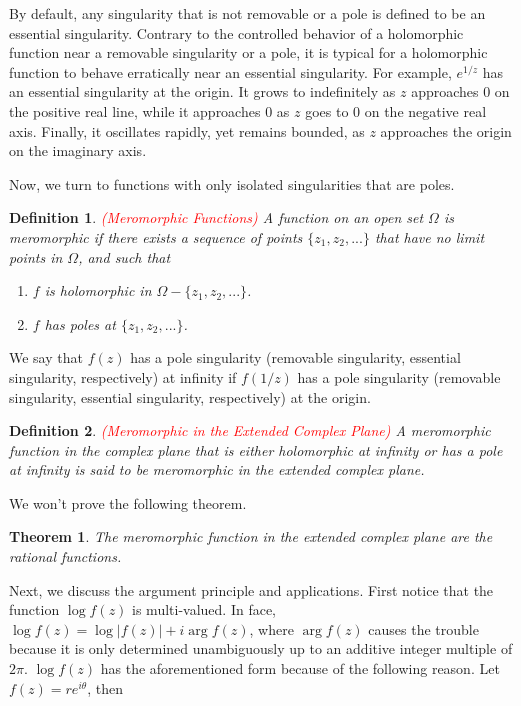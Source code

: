 \documentclass{article}
\newtheorem{definition}{Definition}
\newtheorem{theorem}{Theorem}
\begin{document}
By default, any singularity that is not removable or a pole is defined to be an essential singularity. Contrary to the controlled behavior of a holomorphic function near a removable singularity or a pole, it is typical for a holomorphic function to behave erratically near an essential singularity. For example, $e^{1/z}$ has an essential singularity at the origin. It grows to indefinitely as $z$ approaches $0$ on the positive real line, while it approaches $0$ as $z$ goes to $0$ on the negative real axis. Finally, it oscillates rapidly, yet remains bounded, as $z$ approaches the origin on the imaginary axis. 

Now, we turn to functions with only isolated singularities that are poles.

\begin{definition} \textcolor{red}{(Meromorphic Functions)}
A function on an open set $\Omega$ is meromorphic if there exists a sequence of points $\{z_1,z_2,...\}$ that have no limit points in $\Omega$, and such that 

\begin{enumerate}
\item
$f$ is holomorphic in $\Omega-\{z_1,z_2,...\}$.

\item
$f$ has poles at $\{z_1,z_2,...\}$.
\end{enumerate}
\end{definition}

We say that $f(z)$ has a pole singularity (removable singularity, essential singularity, respectively) at infinity if $f(1/z)$ has a pole singularity (removable singularity, essential singularity, respectively) at the origin. 

\begin{definition} \textcolor{red}{(Meromorphic in the Extended Complex Plane)}
A meromorphic function in the complex plane that is either holomorphic at infinity or has a pole at infinity is said to be  meromorphic in the extended complex plane.
\end{definition}

We won't prove the following theorem.

\begin{theorem}
The meromorphic function in the extended complex plane are the rational functions.
\end{theorem}

Next, we discuss the argument principle and applications. First notice that the function $\log f(z)$ is multi-valued. In face, $\log f(z)=\log|f(z)|+i\arg f(z)$, where $\arg f(z)$ causes the trouble because it is only determined unambiguously up to an additive integer multiple of $2\pi$. $\log f(z)$ has the aforementioned form because of the following reason. Let $f(z)=re^{i\theta}$, then
\end{document}
